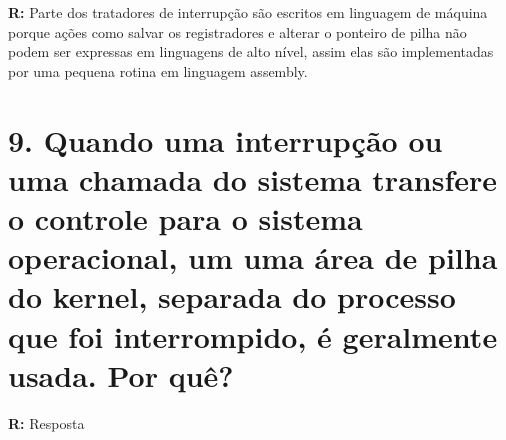 \documentclass{article}
\begin{document}
\medskip
\noindent
\textbf{R:} Parte dos tratadores de interrupção são escritos em linguagem de máquina porque ações como salvar os registradores e alterar o ponteiro de pilha não podem ser expressas em linguagens de alto nível, assim elas são implementadas por uma pequena rotina em linguagem assembly.

\section*{9. \large Quando uma interrupção ou uma chamada do sistema transfere o controle para o sistema operacional, um uma área de pilha do kernel, separada do processo que foi interrompido, é geralmente usada. Por quê?}

\medskip
\noindent
\textbf{R: } Resposta
\end{document}
